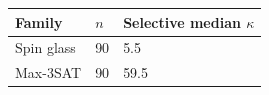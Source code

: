 \begin{tabular}{lll}
\hline
Family & $n$ & Selective median $\kappa$ \\
\hline
Spin glass & 90 & 5.5 \\
Max-3SAT & 90 & 59.5 \\
\hline
\end{tabular}
